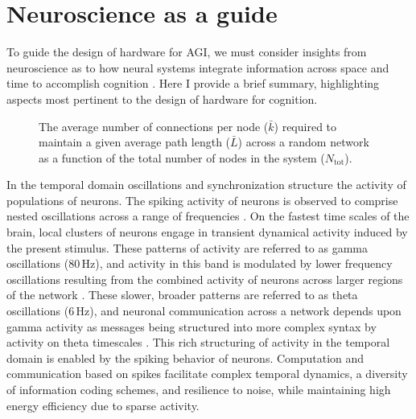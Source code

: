 \documentclass[twocolumn]{article}
\begin{document}
\section{\label{sec:neuroscience}Neuroscience as a guide}
To guide the design of hardware for AGI, we must consider insights from neuroscience as to how neural systems integrate information across space and time to accomplish cognition \cite{bu2006,sp2010,beba2017,khma2018}. Here I provide a brief summary, highlighting aspects most pertinent to the design of hardware for cognition.

\begin{figure}[t]
	\caption{\label{fig:path_length}The average number of connections per node ($\bar{k}$) required to maintain a given average path length ($\bar{L}$)  across a random network as a function of the total number of nodes in the system ($N_{\mathrm{tot}}$).}
\end{figure}
In the temporal domain oscillations and synchronization \cite{bu2006} structure the activity of populations of neurons. The spiking activity of neurons is observed to comprise nested oscillations across a range of frequencies \cite{budr2004}. On the fastest time scales of the brain, local clusters of neurons engage in transient dynamical activity induced by the present stimulus. These patterns of activity are referred to as gamma oscillations (80\,Hz), and activity in this band is modulated by lower frequency oscillations \cite{caed2006,jeco2007} resulting from the combined activity of neurons across larger regions of the network \cite{stsa2000}. These slower, broader patterns are referred to as theta oscillations (6\,Hz), and neuronal communication across a network depends upon gamma activity as messages being structured into more complex syntax by activity on theta timescales \cite{fr2015,bu2019}. This rich structuring of activity in the temporal domain is enabled by the spiking behavior of neurons. Computation and communication based on spikes facilitate complex temporal dynamics, a diversity of information coding schemes, and resilience to noise, while maintaining high energy efficiency due to sparse activity.
\end{document}
